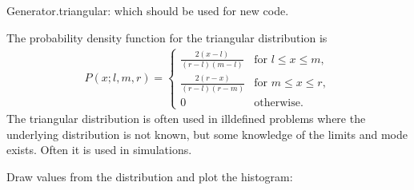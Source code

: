 \documentclass[letterpaper,10pt,english]{sphinxmanual}
\begin{document}
\begin{fulllineitems}
\begin{description}
\end{description}

Generator.triangular: which should be used for new code.

The probability density function for the triangular distribution is
\begin{equation*}
\begin{split}P(x;l, m, r) = \begin{cases}
\frac{2(x-l)}{(r-l)(m-l)}& \text{for $l \leq x \leq m$},\\
\frac{2(r-x)}{(r-l)(r-m)}& \text{for $m \leq x \leq r$},\\
0& \text{otherwise}.
\end{cases}\end{split}
\end{equation*}
The triangular distribution is often used in ill\sphinxhyphen{}defined
problems where the underlying distribution is not known, but
some knowledge of the limits and mode exists. Often it is used
in simulations.

Draw values from the distribution and plot the histogram:

\begin{sphinxVerbatim}[commandchars=\\\{\}]
   
      
             
\end{sphinxVerbatim}

\end{fulllineitems}

\end{document}
